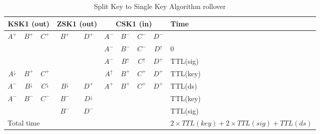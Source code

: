 \documentclass[twoside, a4paper]{article}
\begin{document}
\begin{table}[h]
\centering
\begin{tabular}{ |ccc|cc|cccc|l| }
\hline
\multicolumn{3}{|c|}{KSK1 (out)} & \multicolumn{2}{c|}{ZSK1 (out)} & \multicolumn{4}{c|}{CSK1 (in)} & Time\\
\hline
$A^{+}$ & $B^{+}$ & $C^{+}$ & $B^{+}$          & $D^{+}$          & $A^{-}$ & $B^{-}$ & $C^{-}$ & $D^{-}$               & \\
        &         &         &                  &                  & $A^{-}$ & $B^{-}$ & $C^{-}$ & $D^{\uparrow}$        & 0\\
        &         &         &                  &                  & $A^{-}$ & $B^{\uparrow}$ & $C^{\uparrow}$ & $D^{+}$ & TTL(sig)\\
$A^{\downarrow}$  & $B^{+}$ & $C^{+}$ &        &                  & $A^{\uparrow}$ & $B^{+}$ & $C^{+}$ & $D^{+}$        & TTL(key)\\
$A^{-}$  & $B^{\downarrow}$ & $C^{\downarrow}$ & $B^{\downarrow}$ &$D^{+}$ & $A^{+}$ & $B^{+}$ & $C^{+}$ & $D^{+}$               & TTL(ds)\\
$A^{-}$  & $B^{-}$ & $C^{-}$ & $B^{-}$ &$D^{\downarrow}$ &    &   &   &                                        & TTL(key)\\
        &         &         & $B^{-}$ & $D^{-}$                   &    &   &   &                                        & TTL(sig)\\
\hline
\multicolumn{9}{|l|}{Total time} & $2 \times TTL(key) + 2 \times TTL(sig) + TTL(ds)$\\
\hline
\end{tabular}
\caption{Split Key to Single Key Algorithm rollover}
\label{tab:roll_doublerrsig}
\end{table}
\end{document}

